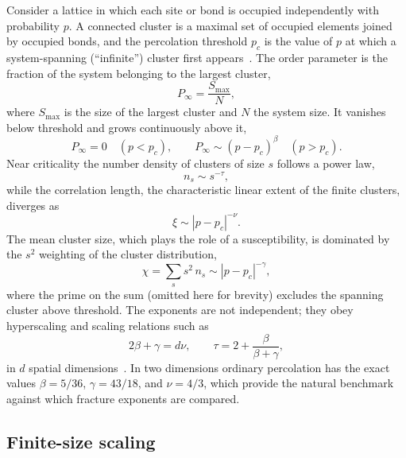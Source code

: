 \documentclass[preprint,12pt]{elsarticle}
\begin{document}
Consider a lattice in which each site or bond is occupied independently with
probability $p$. A connected cluster is a maximal set of occupied elements joined by
occupied bonds, and the percolation threshold $p_c$ is the value of $p$ at which a
system-spanning (``infinite'') cluster first appears~\cite{StaufferAharony1994}. The
order parameter is the fraction of the system belonging to the largest cluster,
\begin{equation}
P_\infty = \frac{S_{\max}}{N},
\label{eq:Pinf-perc}
\end{equation}
where $S_{\max}$ is the size of the largest cluster and $N$ the system size. It
vanishes below threshold and grows continuously above it,
\begin{equation}
P_\infty = 0 \quad (p<p_c), \qquad
P_\infty \sim (p-p_c)^{\beta} \quad (p>p_c).
\label{eq:beta}
\end{equation}
Near criticality the number density of clusters of size $s$ follows a power law,
\begin{equation}
n_s \sim s^{-\tau},
\label{eq:tau}
\end{equation}
while the correlation length, the characteristic linear extent of the finite
clusters, diverges as
\begin{equation}
\xi \sim |p-p_c|^{-\nu}.
\label{eq:nu}
\end{equation}
The mean cluster size, which plays the role of a susceptibility, is dominated by the
$s^2$ weighting of the cluster distribution,
\begin{equation}
\chi = \sum_s s^2\, n_s \sim |p-p_c|^{-\gamma},
\label{eq:gamma}
\end{equation}
where the prime on the sum (omitted here for brevity) excludes the spanning cluster
above threshold. The exponents are not independent; they obey hyperscaling and
scaling relations such as
\begin{equation}
2\beta + \gamma = d\nu, \qquad \tau = 2 + \frac{\beta}{\beta+\gamma},
\label{eq:scaling-rel}
\end{equation}
in $d$ spatial dimensions~\cite{Stauffer1979}. In two dimensions ordinary percolation
has the exact values $\beta = 5/36$, $\gamma = 43/18$, and $\nu = 4/3$, which provide
the natural benchmark against which fracture exponents are compared.

\subsection{Finite-size scaling}
\label{sec:fss}
\end{document}
